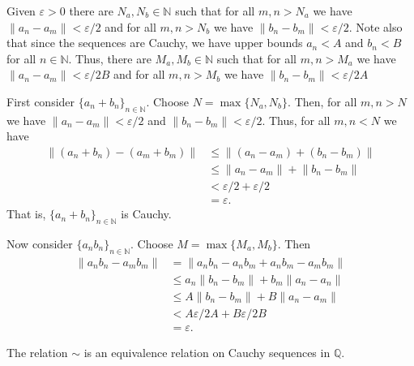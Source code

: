 \documentclass[12 pt, letterpaper]{hmcpset}
\begin{document}
\begin{solution}
	Given $\varepsilon > 0$ there are $N_{a}, N_{b} \in \mathbb{N}$ such that for all $m, n > N_{a}$ we have $\lVert a_{n} - a_{m} \rVert < \varepsilon / 2$ and for all $m, n > N_{b}$ we have $\lVert b_{n} - b_{m} \rVert < \varepsilon / 2$. Note also that since the sequences are Cauchy, we have upper bounds $a_{n} < A$ and $b_{n} < B$ for all $n \in \mathbb{N}$. Thus, there are $M_{a}, M_{b} \in \mathbb{N}$ such that for all $m, n > M_{a}$ we have  $\lVert a_{n} - a_{m} \rVert < \varepsilon / 2 B$ and for all $m, n > M_{b}$ we have $\lVert b_{n} - b_{m} \rVert < \varepsilon / 2 A$

	First consider $\{ a_{n} + b_{n} \}_{n \in \mathbb{N}}$. Choose $N = \max \{ N_{a}, N_{b} \}$. Then, for all $m, n > N$ we have $\lVert a_{n} - a_{m} \rVert < \varepsilon / 2$ and $\lVert b_{n} - b_{m} \rVert < \varepsilon / 2$. Thus, for all $m, n < N$ we have
	\begin{align*}
		\lVert (a_{n} + b_{n}) - (a_{m} + b_{m}) \rVert & \le \lVert (a_{n} - a_{m}) + (b_{n} - b_{m}) \rVert \\
								& \le \lVert a_{n} - a_{m} \rVert + \lVert b_{n} - b_{m} \rVert \\
								& < \varepsilon / 2 + \varepsilon / 2 \\
								& = \varepsilon.
	\end{align*}
	That is, $\{ a_{n} + b_{n} \}_{n \in \mathbb{N}}$ is Cauchy.

	Now consider $\{ a_{n} b_{n} \}_{n \in \mathbb{N}}$. Choose $M = \max \{ M_{a}, M_{b} \}$. Then
	\begin{align*}
		\lVert a_{n} b_{n} - a_{m} b_{m} \rVert & = \lVert a_{n} b_{n} - a_{n} b_{m} + a_{n} b_{m} - a_{m} b_{m} \rVert \\
							& \le a_{n} \lVert b_{n} - b_{m} \rVert + b_{m} \lVert a_{n} - a_{n} \rVert \\
							& \le A \lVert b_{n} - b_{m} \rVert + B \lVert a_{n} - a_{m} \rVert \\
							& < A \varepsilon / 2 A + B \varepsilon / 2 B \\
							& = \varepsilon.
	\end{align*}
\end{solution}

\pagebreak

\begin{problem}[(5)]
	The relation $\sim$ is an equivalence relation on Cauchy sequences in $\mathbb{Q}$.
\end{problem}
\end{document}
